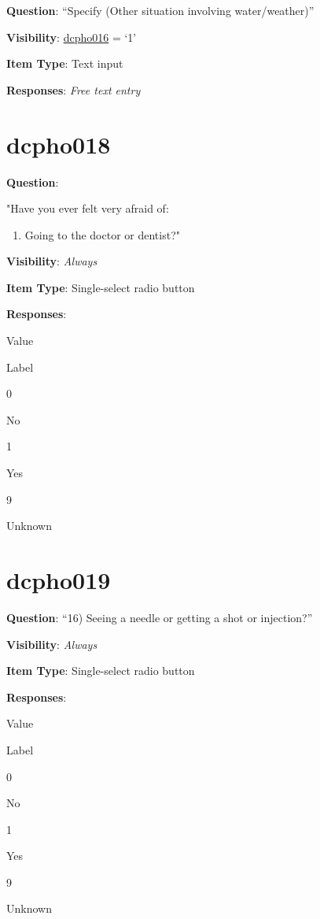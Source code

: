 \documentclass[]{book}
\providecommand{\tightlist}{%
  \setlength{\itemsep}{0pt}\setlength{\parskip}{0pt}}
\begin{document}
\textbf{Question}: ``Specify (Other situation involving water/weather)''

\textbf{Visibility}: \protect\hyperlink{dcpho016}{dcpho016} = `1'

\textbf{Item Type}: Text input

\textbf{Responses}: \emph{Free text entry}

\hypertarget{dcpho018}{%
\section{dcpho018}\label{dcpho018}}

\textbf{Question}:

"Have you ever felt very afraid of:

\begin{enumerate}
\def\labelenumi{\arabic{enumi})}
\setcounter{enumi}{14}
\tightlist
\item
  Going to the doctor or dentist?"
\end{enumerate}

\textbf{Visibility}: \emph{Always}

\textbf{Item Type}: Single-select radio button

\textbf{Responses}:

Value

Label

0

No

1

Yes

9

Unknown

\hypertarget{dcpho019}{%
\section{dcpho019}\label{dcpho019}}

\textbf{Question}: ``16) Seeing a needle or getting a shot or injection?''

\textbf{Visibility}: \emph{Always}

\textbf{Item Type}: Single-select radio button

\textbf{Responses}:

Value

Label

0

No

1

Yes

9

Unknown
\end{document}
